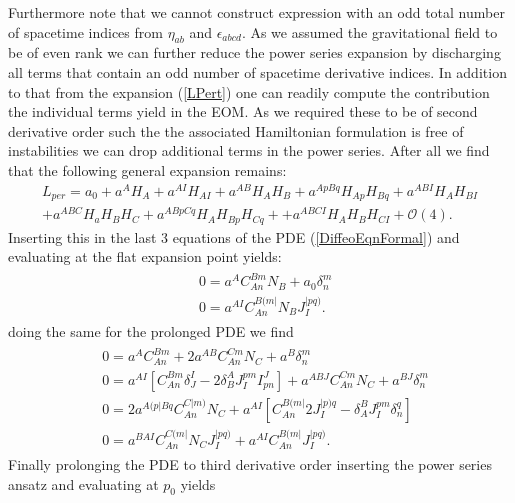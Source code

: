 \documentclass[a4paper,12pt, DIV=14, BCOR=5mm, twoside, headsepline, numbers=noenddot]{scrbook}
\begin{document}
Furthermore note that we cannot construct expression with an odd total number of spacetime indices from $\eta_{ab}$ and $\epsilon_{abcd}$. As we assumed the gravitational field to be of even rank we can further reduce the power series expansion by discharging all terms that contain an odd number of spacetime derivative indices. In addition to that from the expansion (\ref{LPert}) one can readily compute the contribution the individual terms yield in the EOM.  As we required these to be of second derivative order such the the associated Hamiltonian formulation is free of instabilities we can drop additional terms in the power series. After all we find that the following general expansion remains: 
\begin{multline}\label{LperRed}
     L_{per} = a_0 + a^A H_A + a^{AI}H_{AI} + a^{AB} H_{A}H_{B} + a^{ApBq} H_{Ap}H_{Bq} + a^{ABI} H_{A} H_{BI} \\
    + a^{ABC} H_a H_B H_C + a^{ABpCq} H_{A}H_{Bp}H_{Cq} +
    + a^{ABCI} H_A H_B H_{CI} 
    + \mathcal{O}(4).
\end{multline}
Inserting this in the last 3 equations of the PDE (\ref{DiffeoEqnFormal}) and evaluating at the flat expansion point yields:
\begin{align}\label{order1}
    \begin{aligned}
    &0 = a^A C_{An}^{Bm}N_B + a_0 \delta^m_n\\
    &0 = a^{AI}C_{An}^{B(m\vert }N_B J^{\vert pq)}_I.
    \end{aligned}
\end{align}
doing the same for the prolonged PDE we find 
\begin{align}\label{order2}
    \begin{aligned}
    &0 = a^A C_{An}^{Bm} + 2 a^{AB}C_{An}^{Cm}N_C + a^B\delta^m_n\\
    &0 = a^{AI}\left [C_{An}^{Bm}\delta^I _J- 2 \delta^A_B J_I^{pm}I^J_{pn} \right ] + a^{ABJ}C_{An}^{Cm}N_C + a^{BJ} \delta^m_n \\
    &0 = 2a^{A(p\vert Bq}C_{An}^{C\vert m)}N_C + a^{AI} \left [C_{An}^{B(m\vert} 2 J_{I}^{\vert p)q} - \delta_A^BJ_I^{pm}\delta^q_n \right ]\\
    &0 = a^{BAI}C_{An}^{C(m\vert}N_CJ_I^{\vert pq)} + a^{AI}C_{An}^{B(m \vert} J_I^{\vert pq)}.
    \end{aligned}
\end{align}
Finally prolonging the PDE to third derivative order inserting the power series ansatz and evaluating at $p_0$ yields
\end{document}
